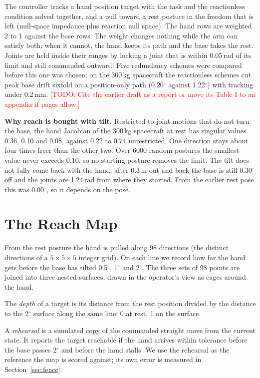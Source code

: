 \documentclass[conference]{IEEEtran}
\newcommand{\todo}[1]{\textcolor{red}{[TODO: #1]}}
\begin{document}
The controller tracks a hand position target with the task and the reactionless condition solved
together, and a pull toward a rest posture in the freedom that is left (null-space impedance plus
reaction null space). The hand rows are weighted 2 to 1 against the base rows. The weight changes nothing while the arm can
satisfy both; when it cannot, the hand keeps its path and the base takes the rest. Joints
are held inside their ranges by locking a joint that is within 0.05\,rad of its limit and still commanded
outward. Five redundancy schemes were compared before this one was chosen; on the 300\,kg spacecraft the
reactionless schemes cut peak base drift sixfold on a position-only path (0.20$^\circ$ against
1.22$^\circ$) with tracking under 0.2\,mm. \todo{Cite the earlier draft as a report or move its Table I to
an appendix if pages allow.}

\textbf{Why reach is bought with tilt.} Restricted to joint motions that do not turn the base, the hand
Jacobian of the 300\,kg spacecraft at rest has singular values 0.36, 0.10 and 0.08, against 0.22 to 0.74
unrestricted. One direction stays about four times freer than the other two. Over 6000
random postures the smallest value never exceeds 0.10, so no starting posture removes the limit. The tilt
does not fully come back with the hand: after 0.3\,m out and back the base is still 0.30$^\circ$ off and the
joints are 1.24\,rad from where they started. From the earlier rest pose this was 0.00$^\circ$, so it depends on the pose.

\section{The Reach Map}
From the rest posture the hand is pulled along 98 directions (the distinct directions of a
$5\times5\times5$ integer grid). On each line we record how far the hand gets before the base has tilted
0.5$^\circ$, 1$^\circ$ and 2$^\circ$. The three sets of 98 points are joined into three nested surfaces, drawn
in the operator's view as cages around the hand.

The \emph{depth} of a target is its distance from the rest position divided by the distance to the
2$^\circ$ surface along the same line: 0 at rest, 1 on the surface.

A \emph{rehearsal} is a simulated copy of the commanded straight move from the current state. It reports
the target reachable if the hand arrives within tolerance before the base passes 2$^\circ$ and before the hand
stalls. We use the rehearsal as the reference the map is scored against; its own error is measured in
Section~\ref{sec:fence}.
\end{document}
